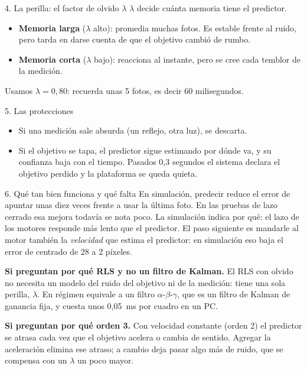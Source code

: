 \documentclass[11pt,a4paper]{article}
\newcommand{\lam}{\lambda}
\begin{document}
\begin{lamina}{4. La perilla: el factor de olvido $\lam$}
$\lam$ decide cuánta memoria tiene el predictor.
\begin{itemize}
  \item \textbf{Memoria larga} ($\lam$ alto): promedia muchas fotos. Es estable frente al ruido, pero tarda en
        darse cuenta de que el objetivo cambió de rumbo.
  \item \textbf{Memoria corta} ($\lam$ bajo): reacciona al instante, pero se cree cada temblor de la medición.
\end{itemize}
Usamos $\lam = 0{,}80$: recuerda unas 5 fotos, es decir 60 milisegundos.
\end{lamina}

\begin{lamina}{5. Las protecciones}
\begin{itemize}
  \item Si una medición sale absurda (un reflejo, otra luz), se descarta.
  \item Si el objetivo se tapa, el predictor sigue estimando por dónde va, y su confianza baja con el tiempo.
        Pasados 0,3 segundos el sistema declara el objetivo perdido y la plataforma se queda quieta.
\end{itemize}
\end{lamina}

\begin{lamina}{6. Qué tan bien funciona y qué falta}
En simulación, predecir reduce el error de apuntar unas diez veces frente a usar la última foto. En las
pruebas de lazo cerrado esa mejora todavía se nota poco. La simulación indica por qué: el lazo de los
motores responde más lento que el predictor. El paso siguiente es mandarle al motor también la \emph{velocidad} que estima el predictor: en simulación eso
baja el error de centrado de 28 a 2 píxeles.
\end{lamina}

\textbf{Si preguntan por qué RLS y no un filtro de Kalman.} El RLS con olvido no necesita un modelo del ruido
del objetivo ni de la medición: tiene una sola perilla, $\lam$. En régimen equivale a un filtro $\alpha$-$\beta$-$\gamma$, que es un
filtro de Kalman de ganancia fija, y cuesta unos 0,05~ms por cuadro en un PC.

\textbf{Si preguntan por qué orden 3.} Con velocidad constante (orden 2) el predictor se atrasa cada vez que el
objetivo acelera o cambia de sentido. Agregar la aceleración elimina ese atraso; a cambio deja pasar algo más
de ruido, que se compensa con un $\lam$ un poco mayor.
\end{document}
